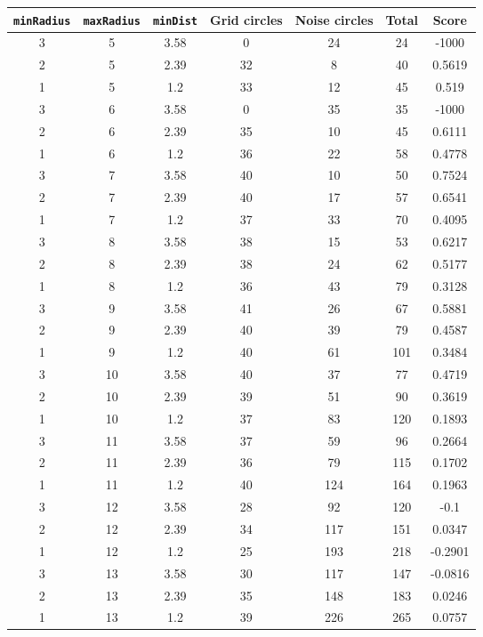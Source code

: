 \documentclass[letterpaper, 12pt]{article}
\begin{document}
\begin{longtable}{|c|c|c|c|c|c|c|}
\hline
\textbf{\texttt{minRadius}} & \textbf{\texttt{maxRadius}} & \textbf{\texttt{minDist}} & \textbf{Grid circles} & \textbf{Noise circles} & \textbf{Total} & \textbf{Score} \\
\hline
3 & 5 & 3.58 & 0 & 24 & 24 & -1000 \\
\hline
2 & 5 & 2.39 & 32 & 8 & 40 & 0.5619 \\
\hline
1 & 5 & 1.2 & 33 & 12 & 45 & 0.519 \\
\hline
3 & 6 & 3.58 & 0 & 35 & 35 & -1000 \\
\hline
2 & 6 & 2.39 & 35 & 10 & 45 & 0.6111 \\
\hline
1 & 6 & 1.2 & 36 & 22 & 58 & 0.4778 \\
\hline
3 & 7 & 3.58 & 40 & 10 & 50 & 0.7524 \\
\hline
2 & 7 & 2.39 & 40 & 17 & 57 & 0.6541 \\
\hline
1 & 7 & 1.2 & 37 & 33 & 70 & 0.4095 \\
\hline
3 & 8 & 3.58 & 38 & 15 & 53 & 0.6217 \\
\hline
2 & 8 & 2.39 & 38 & 24 & 62 & 0.5177 \\
\hline
1 & 8 & 1.2 & 36 & 43 & 79 & 0.3128 \\
\hline
3 & 9 & 3.58 & 41 & 26 & 67 & 0.5881 \\
\hline
2 & 9 & 2.39 & 40 & 39 & 79 & 0.4587 \\
\hline
1 & 9 & 1.2 & 40 & 61 & 101 & 0.3484 \\
\hline
3 & 10 & 3.58 & 40 & 37 & 77 & 0.4719 \\
\hline
2 & 10 & 2.39 & 39 & 51 & 90 & 0.3619 \\
\hline
1 & 10 & 1.2 & 37 & 83 & 120 & 0.1893 \\
\hline
3 & 11 & 3.58 & 37 & 59 & 96 & 0.2664 \\
\hline
2 & 11 & 2.39 & 36 & 79 & 115 & 0.1702 \\
\hline
1 & 11 & 1.2 & 40 & 124 & 164 & 0.1963 \\
\hline
3 & 12 & 3.58 & 28 & 92 & 120 & -0.1 \\
\hline
2 & 12 & 2.39 & 34 & 117 & 151 & 0.0347 \\
\hline
1 & 12 & 1.2 & 25 & 193 & 218 & -0.2901 \\
\hline
3 & 13 & 3.58 & 30 & 117 & 147 & -0.0816 \\
\hline
2 & 13 & 2.39 & 35 & 148 & 183 & 0.0246 \\
\hline
1 & 13 & 1.2 & 39 & 226 & 265 & 0.0757 \\

\end{longtable}
\end{document}
